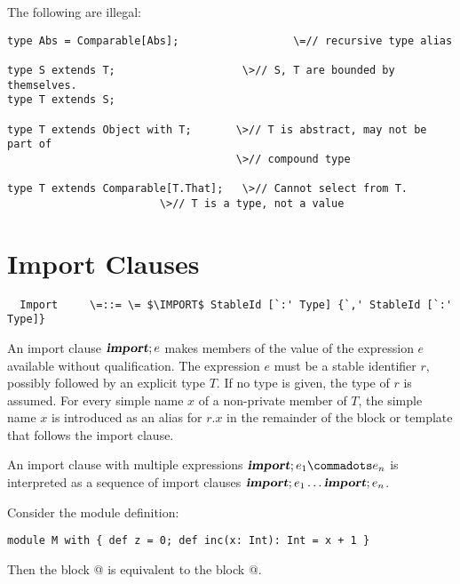 \documentclass[11pt]{report}
\begin{document}
The following are illegal:
\begin{verbatim}
type Abs = Comparable[Abs];	                 \=// recursive type alias

type S extends T;                    \>// S, T are bounded by themselves.
type T extends S;

type T extends Object with T;	    \>// T is abstract, may not be part of
                                    \>// compound type

type T extends Comparable[T.That];   \>// Cannot select from T.
			            \>// T is a type, not a value
\end{verbatim}


\section{Import Clauses}
\label{sec:import}

\syntax\begin{verbatim}
  Import     \=::= \= $\IMPORT$ StableId [`:' Type] {`,' StableId [`:' Type]}
\end{verbatim}

An import clause $\mbox{\sl\bfseries import};e$ makes members of the value of the
expression $e$ available without qualification. The expression $e$
must be a stable identifier $r$, possibly followed by an explicit type
$T$. If no type is given, the type of $r$ is assumed.  For every
simple name $x$ of a non-private member of $T$, the simple name $x$ is
introduced as an alias for $r.x$ in the remainder of the block or
template that follows the import clause.

An import clause with multiple expressions $\IMPORT;e_1
\commadots e_n$ is interpreted as a sequence of import clauses
$\mbox{\sl\bfseries import};e_1 \ldots \mbox{\sl\bfseries import};e_n$.

\example Consider the module definition:
\begin{verbatim}
module M with { def z = 0; def inc(x: Int): Int = x + 1 }
\end{verbatim}
Then the block
@
is equivalent to the block @.
\end{document}
